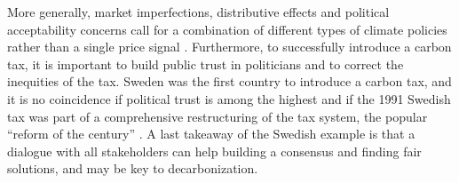 \documentclass[english,5p,authoryear]{elsarticle}
\begin{document}
More generally, market imperfections, distributive effects and political acceptability concerns call for a combination of different types of climate policies rather than a single price signal \citep{stern_report_2017,stiglitz_addressing_2019}. Furthermore, to successfully introduce a carbon tax, it is important to build public trust in politicians \citep{harring_jagers_2013} and to correct the inequities of the tax. Sweden was the first country to introduce a carbon tax, and it is no coincidence if political trust is among the highest \citep{klenert_making_2018} and if the 1991 Swedish tax was part of a comprehensive restructuring of the tax system, the popular ``reform of the century'' \citep{sterner_environmental_2014}. A last takeaway of the Swedish example is that a dialogue with all stakeholders can help building a consensus and finding fair solutions, and may be key to decarbonization.



\end{document}
